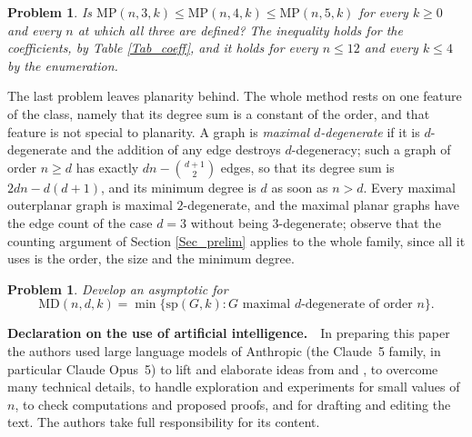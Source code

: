 \documentclass[12pt,a4paper]{article}%
\newtheorem{problem}[theorem]{Problem}
\begin{document}
\begin{problem}
\label{Pr_monotone}
Is $\mathrm{MP}(n,3,k)\leq \mathrm{MP}(n,4,k)\leq \mathrm{MP}(n,5,k)$ for every $k\geq 0$ and every
$n$ at which all three are defined? The inequality holds for the coefficients, by Table
\ref{Tab_coeff}, and it holds for every $n\leq 12$ and every $k\leq 4$ by the enumeration.
\end{problem}

The last problem leaves planarity behind. The whole method rests on one feature of the class, namely
that its degree sum is a constant of the order, and that feature is not special to planarity. A graph is
\emph{maximal $d$-degenerate} if it is $d$-degenerate and the addition of any edge destroys
$d$-degeneracy; such a graph of order $n\geq d$ has exactly $dn-\binom{d+1}{2}$ edges, so that its degree
sum is $2dn-d(d+1)$, and its minimum degree is $d$ as soon as $n>d$. Every maximal outerplanar graph is
maximal $2$-degenerate, and the maximal planar graphs have the edge count of the case $d=3$
without being $3$-degenerate; observe that the counting argument of Section \ref{Sec_prelim} applies to the
whole family, since all it uses is the order, the size and the minimum degree.

\begin{problem}
\label{Pr_degenerate}Develop an asymptotic for
\[
\mathrm{MD}(n,d,k)=\min \{\mathrm{sp}(G,k):G\text{ maximal }d\text{-degenerate of order }n\} .
\]
\end{problem}


\bigskip\noindent\textbf{Declaration on the use of artificial intelligence.}~~In preparing this paper the
authors used large language models of Anthropic (the Claude~5 family, in particular Claude Opus~5) to lift
and elaborate ideas from \cite{CaroLauriZarb} and \cite{CaroWest}, to overcome many technical details, to
handle exploration and experiments for small values of $n$, to check computations and proposed proofs, and
for drafting and editing the text. The authors take full responsibility for its content.
\end{document}

